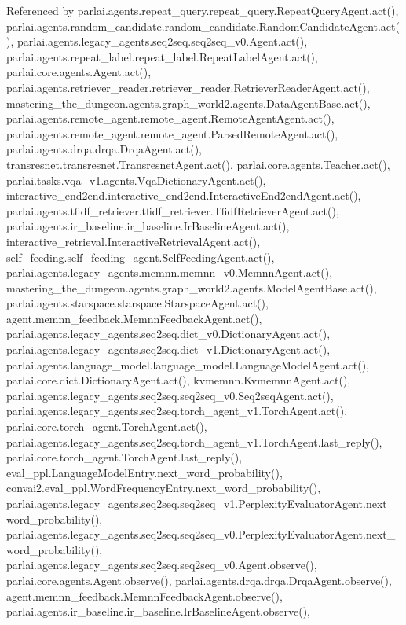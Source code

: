 Referenced by parlai.\+agents.\+repeat\+\_\+query.\+repeat\+\_\+query.\+Repeat\+Query\+Agent.\+act(), parlai.\+agents.\+random\+\_\+candidate.\+random\+\_\+candidate.\+Random\+Candidate\+Agent.\+act(), parlai.\+agents.\+legacy\+\_\+agents.\+seq2seq.\+seq2seq\+\_\+v0.\+Agent.\+act(), parlai.\+agents.\+repeat\+\_\+label.\+repeat\+\_\+label.\+Repeat\+Label\+Agent.\+act(), parlai.\+core.\+agents.\+Agent.\+act(), parlai.\+agents.\+retriever\+\_\+reader.\+retriever\+\_\+reader.\+Retriever\+Reader\+Agent.\+act(), mastering\+\_\+the\+\_\+dungeon.\+agents.\+graph\+\_\+world2.\+agents.\+Data\+Agent\+Base.\+act(), parlai.\+agents.\+remote\+\_\+agent.\+remote\+\_\+agent.\+Remote\+Agent\+Agent.\+act(), parlai.\+agents.\+remote\+\_\+agent.\+remote\+\_\+agent.\+Parsed\+Remote\+Agent.\+act(), parlai.\+agents.\+drqa.\+drqa.\+Drqa\+Agent.\+act(), transresnet.\+transresnet.\+Transresnet\+Agent.\+act(), parlai.\+core.\+agents.\+Teacher.\+act(), parlai.\+tasks.\+vqa\+\_\+v1.\+agents.\+Vqa\+Dictionary\+Agent.\+act(), interactive\+\_\+end2end.\+interactive\+\_\+end2end.\+Interactive\+End2end\+Agent.\+act(), parlai.\+agents.\+tfidf\+\_\+retriever.\+tfidf\+\_\+retriever.\+Tfidf\+Retriever\+Agent.\+act(), parlai.\+agents.\+ir\+\_\+baseline.\+ir\+\_\+baseline.\+Ir\+Baseline\+Agent.\+act(), interactive\+\_\+retrieval.\+Interactive\+Retrieval\+Agent.\+act(), self\+\_\+feeding.\+self\+\_\+feeding\+\_\+agent.\+Self\+Feeding\+Agent.\+act(), parlai.\+agents.\+legacy\+\_\+agents.\+memnn.\+memnn\+\_\+v0.\+Memnn\+Agent.\+act(), mastering\+\_\+the\+\_\+dungeon.\+agents.\+graph\+\_\+world2.\+agents.\+Model\+Agent\+Base.\+act(), parlai.\+agents.\+starspace.\+starspace.\+Starspace\+Agent.\+act(), agent.\+memnn\+\_\+feedback.\+Memnn\+Feedback\+Agent.\+act(), parlai.\+agents.\+legacy\+\_\+agents.\+seq2seq.\+dict\+\_\+v0.\+Dictionary\+Agent.\+act(), parlai.\+agents.\+legacy\+\_\+agents.\+seq2seq.\+dict\+\_\+v1.\+Dictionary\+Agent.\+act(), parlai.\+agents.\+language\+\_\+model.\+language\+\_\+model.\+Language\+Model\+Agent.\+act(), parlai.\+core.\+dict.\+Dictionary\+Agent.\+act(), kvmemnn.\+Kvmemnn\+Agent.\+act(), parlai.\+agents.\+legacy\+\_\+agents.\+seq2seq.\+seq2seq\+\_\+v0.\+Seq2seq\+Agent.\+act(), parlai.\+agents.\+legacy\+\_\+agents.\+seq2seq.\+torch\+\_\+agent\+\_\+v1.\+Torch\+Agent.\+act(), parlai.\+core.\+torch\+\_\+agent.\+Torch\+Agent.\+act(), parlai.\+agents.\+legacy\+\_\+agents.\+seq2seq.\+torch\+\_\+agent\+\_\+v1.\+Torch\+Agent.\+last\+\_\+reply(), parlai.\+core.\+torch\+\_\+agent.\+Torch\+Agent.\+last\+\_\+reply(), eval\+\_\+ppl.\+Language\+Model\+Entry.\+next\+\_\+word\+\_\+probability(), convai2.\+eval\+\_\+ppl.\+Word\+Frequency\+Entry.\+next\+\_\+word\+\_\+probability(), parlai.\+agents.\+legacy\+\_\+agents.\+seq2seq.\+seq2seq\+\_\+v1.\+Perplexity\+Evaluator\+Agent.\+next\+\_\+word\+\_\+probability(), parlai.\+agents.\+legacy\+\_\+agents.\+seq2seq.\+seq2seq\+\_\+v0.\+Perplexity\+Evaluator\+Agent.\+next\+\_\+word\+\_\+probability(), parlai.\+agents.\+legacy\+\_\+agents.\+seq2seq.\+seq2seq\+\_\+v0.\+Agent.\+observe(), parlai.\+core.\+agents.\+Agent.\+observe(), parlai.\+agents.\+drqa.\+drqa.\+Drqa\+Agent.\+observe(), agent.\+memnn\+\_\+feedback.\+Memnn\+Feedback\+Agent.\+observe(), parlai.\+agents.\+ir\+\_\+baseline.\+ir\+\_\+baseline.\+Ir\+Baseline\+Agent.\+observe(), 